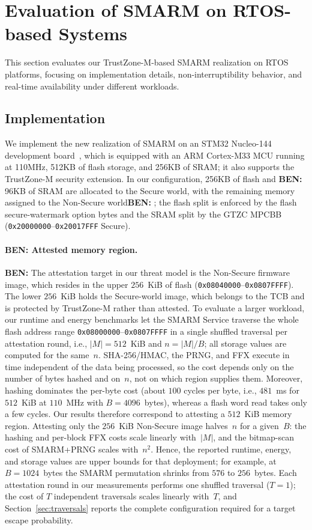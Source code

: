 \documentclass{ieeeaccess}
\DeclareRobustCommand{\ben}[1]{{\color{BENcolor}\textbf{BEN:} #1}}
\newcommand{\rtsmarmone}{SMARM+PRNG\xspace}
\begin{document}
\section{Evaluation of SMARM on RTOS-based Systems}
\label{sec:evaluation}

This section evaluates our TrustZone-M-based SMARM realization on RTOS platforms, focusing on implementation details, non-interruptibility behavior, and real-time availability under different workloads.

\subsection{Implementation}

We implement the new realization of SMARM on an STM32 Nucleo-144 development board~\cite{stm32l552_nucleo144}, which is equipped with an ARM Cortex-M33 MCU running at 110MHz, 512KB of flash storage, and 256KB of SRAM;
it also supports the TrustZone-M security extension.
In our configuration, 256KB of flash and \ben{96KB} of SRAM are allocated to the Secure world, with the remaining memory assigned to the Non-Secure world\ben{; the flash split is enforced by the flash secure-watermark option bytes and the SRAM split by the GTZC MPCBB (\texttt{0x20000000}--\texttt{0x20017FFF} Secure)}.

\paragraph{\ben{Attested memory region.}}
\ben{The attestation target in our threat model is the Non-Secure firmware image, which resides in the upper $256$~KiB of flash (\texttt{0x08040000}--\texttt{0x0807FFFF}).
The lower $256$~KiB holds the Secure-world image, which belongs to the TCB and is protected by TrustZone-M rather than attested.
To evaluate a larger workload, our runtime and energy benchmarks let the SMARM Service traverse the whole flash address range \texttt{0x08000000}--\texttt{0x0807FFFF} in a single shuffled traversal per attestation round, i.e., $|M| = 512$~KiB and $n = |M|/B$; all storage values are computed for the same~$n$.
SHA-256/HMAC, the PRNG, and FFX execute in time independent of the data being processed, so the cost depends only on the number of bytes hashed and on~$n$, not on which region supplies them.
Moreover, hashing dominates the per-byte cost (about $100$ cycles per byte, i.e., $481$~ms for $512$~KiB at $110$~MHz with $B = 4096$~bytes), whereas a flash word read takes only a few cycles.
Our results therefore correspond to attesting a $512$~KiB memory region.
Attesting only the $256$~KiB Non-Secure image halves~$n$ for a given~$B$: the hashing and per-block FFX costs scale linearly with~$|M|$, and the bitmap-scan cost of \rtsmarmone scales with~$n^2$.
Hence, the reported runtime, energy, and storage values are upper bounds for that deployment; for example, at $B = 1024$~bytes the SMARM permutation shrinks from $576$ to $256$~bytes.
Each attestation round in our measurements performs one shuffled traversal ($T = 1$); the cost of $T$ independent traversals scales linearly with~$T$, and Section~\ref{sec:traversals} reports the complete configuration required for a target escape probability.}
\end{document}
